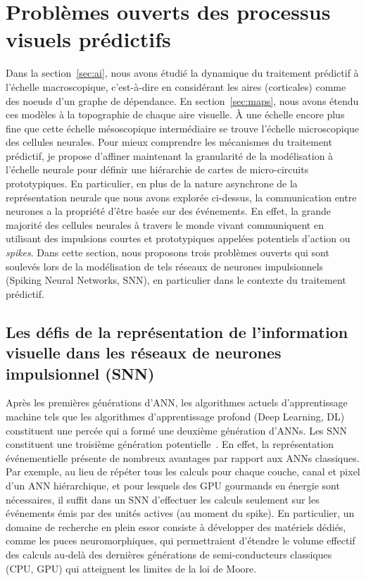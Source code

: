 \section{Problèmes ouverts des processus visuels prédictifs}
\label{sec:spikes}
Dans la section~\ref{sec:ai}, nous avons étudié la dynamique du traitement prédictif à
l'échelle macroscopique, c'est-à-dire en considérant les aires
(corticales) comme des noeuds d'un graphe de dépendance. En section~\ref{sec:maps},
nous avons étendu ces modèles à la topographie de chaque aire visuelle. À une échelle
encore plus fine que cette échelle mésoscopique intermédiaire se trouve
l'échelle microscopique des cellules neurales. Pour mieux
comprendre les mécanismes du traitement prédictif, je propose d'affiner
maintenant la granularité de la modélisation à l'échelle neurale
pour définir une hiérarchie de cartes de micro-circuits prototypiques. En
particulier, en plus de la nature asynchrone de la représentation
neurale que nous avons explorée ci-dessus, la communication entre
neurones a la propriété d'être basée sur des événements. En effet, la
grande majorité des cellules neurales à travers le monde vivant
communiquent en utilisant des impulsions courtes et prototypiques
appelées potentiels d'action ou \emph{spikes}. Dans cette section, nous
proposons trois problèmes ouverts qui sont soulevés lors de la
modélisation de tels réseaux de neurones impulsionnels (Spiking Neural Networks, SNN), en particulier dans le contexte du traitement prédictif.

\subsection{Les défis de la représentation de l'information visuelle
dans les réseaux de neurones impulsionnel
(SNN)}
Après les premières générations d'ANN, les algorithmes actuels
d'apprentissage machine tels que les algorithmes d'apprentissage profond
(Deep Learning, DL) constituent une percée qui a formé une deuxième génération d'ANNs.
Les SNN constituent une troisième génération potentielle~\citep{Ghosh09}. En effet, la représentation événementielle présente de
nombreux avantages par rapport aux ANNs classiques. Par exemple, au lieu de
répéter tous les calculs ­pour chaque couche, canal et pixel d'un ANN
hiérarchique, et pour lesquels des GPU gourmands en énergie sont
nécessaires, il suffit dans un SNN d'effectuer les calculs seulement sur les événements
émis par des unités actives (au moment du spike). En particulier, un domaine de
recherche en plein essor consiste à développer des matériels dédiés,
comme les puces neuromorphiques, qui permettraient d'étendre le volume
effectif des calculs au-delà des dernières générations de
semi-conducteurs classiques (CPU, GPU) qui atteignent les limites de la
loi de Moore.

